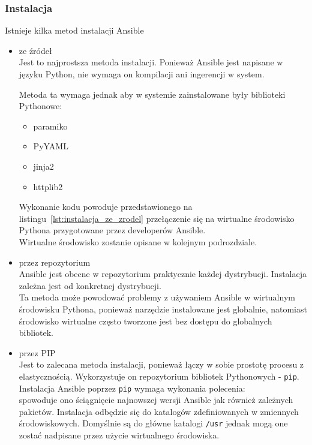 \subsubsection{Instalacja}
\label{sec:konfiguracja_ansible_instalacja}
Istnieje kilka metod instalacji Ansible
\begin{itemize}
\item ze źródeł\\
Jest to najprostsza metoda instalacji. Ponieważ Ansible jest napisane w języku Python, nie wymaga on kompilacji ani ingerencji w system.

Metoda ta wymaga jednak aby w systemie zainstalowane były biblioteki Pythonowe:
\begin{itemize}
\item paramiko
\item PyYAML
\item jinja2
\item httplib2
\end{itemize}
Wykonanie kodu powoduje przedstawionego na listingu~\ref{lst:instalacja_ze_zrodel} przełączenie się na wirtualne środowisko Pythona przygotowane przez developerów Ansible.\\
Wirtualne środowisko zostanie opisane w kolejnym podrozdziale.
\item przez repozytorium\\
Ansible jest obecne w repozytorium praktycznie każdej dystrybucji. Instalacja zależna jest od konkretnej dystrybucji.\\
Ta metoda może powodować problemy z używaniem Ansible w wirtualnym środowisku Pythona, ponieważ narzędzie instalowane jest globalnie, natomiast środowisko wirtualne często tworzone jest bez dostępu do globalnych bibliotek.
\item przez PIP\\
Jest to zalecana metoda instalacji, ponieważ łączy w sobie prostotę procesu z elastycznością.
Wykorzystuje on repozytorium bibliotek Pythonowych - \texttt{pip}.\\
Instalacja Ansible poprzez \texttt{pip} wymaga wykonania polecenia:\\

spowoduje ono ściągnięcie najnowszej wersji Ansible jak również zależnych pakietów.
Instalacja odbędzie się do katalogów zdefiniowanych w zmiennych środowiskowych. Domyślnie są do główne katalogi \texttt{/usr} jednak mogą one zostać nadpisane przez użycie wirtualnego środowiska.
\end{itemize}
